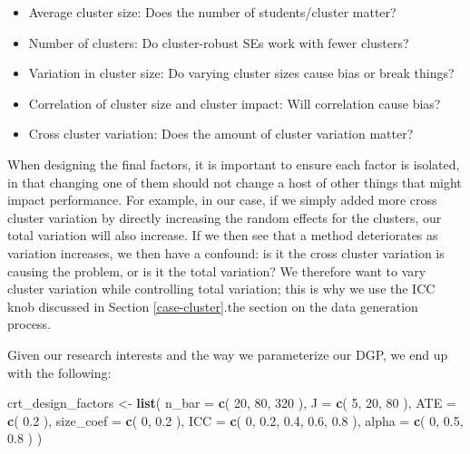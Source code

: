 \documentclass[
]{book}
\newenvironment{Shaded}{\begin{snugshade}}{\end{snugshade}}
\newcommand{\AttributeTok}[1]{\textcolor[rgb]{0.13,0.29,0.53}{#1}}
\newcommand{\DecValTok}[1]{\textcolor[rgb]{0.00,0.00,0.81}{#1}}
\newcommand{\FloatTok}[1]{\textcolor[rgb]{0.00,0.00,0.81}{#1}}
\newcommand{\FunctionTok}[1]{\textcolor[rgb]{0.13,0.29,0.53}{\textbf{#1}}}
\newcommand{\NormalTok}[1]{#1}
\newcommand{\OtherTok}[1]{\textcolor[rgb]{0.56,0.35,0.01}{#1}}
\providecommand{\tightlist}{%
  \setlength{\itemsep}{0pt}\setlength{\parskip}{0pt}}
\begin{document}
\begin{itemize}
\tightlist
\item
  Average cluster size: Does the number of students/cluster matter?
\item
  Number of clusters: Do cluster-robust SEs work with fewer clusters?
\item
  Variation in cluster size: Do varying cluster sizes cause bias or break things?
\item
  Correlation of cluster size and cluster impact: Will correlation cause bias?
\item
  Cross cluster variation: Does the amount of cluster variation matter?
\end{itemize}

When designing the final factors, it is important to ensure each factor is isolated, in that changing one of them should not change a host of other things that might impact performance.
For example, in our case, if we simply added more cross cluster variation by directly increasing the random effects for the clusters, our total variation will also increase.
If we then see that a method deteriorates as variation increases, we then have a confound: is it the cross cluster variation is causing the problem, or is it the total variation?
We therefore want to vary cluster variation while controlling total variation; this is why we use the ICC knob discussed in Section \ref{case-cluster}.the section on the data generation process.

Given our research interests and the way we parameterize our DGP, we end up with the following:

\begin{Shaded}
\begin{Highlighting}[]
\NormalTok{crt\_design\_factors }\OtherTok{\textless{}{-}} \FunctionTok{list}\NormalTok{(}
  \AttributeTok{n\_bar =} \FunctionTok{c}\NormalTok{( }\DecValTok{20}\NormalTok{, }\DecValTok{80}\NormalTok{, }\DecValTok{320}\NormalTok{ ),}
  \AttributeTok{J =} \FunctionTok{c}\NormalTok{( }\DecValTok{5}\NormalTok{, }\DecValTok{20}\NormalTok{, }\DecValTok{80}\NormalTok{ ),}
  \AttributeTok{ATE =} \FunctionTok{c}\NormalTok{( }\FloatTok{0.2}\NormalTok{ ),}
  \AttributeTok{size\_coef =} \FunctionTok{c}\NormalTok{( }\DecValTok{0}\NormalTok{, }\FloatTok{0.2}\NormalTok{ ),}
  \AttributeTok{ICC =} \FunctionTok{c}\NormalTok{( }\DecValTok{0}\NormalTok{, }\FloatTok{0.2}\NormalTok{, }\FloatTok{0.4}\NormalTok{, }\FloatTok{0.6}\NormalTok{, }\FloatTok{0.8}\NormalTok{ ),}
  \AttributeTok{alpha =} \FunctionTok{c}\NormalTok{( }\DecValTok{0}\NormalTok{, }\FloatTok{0.5}\NormalTok{, }\FloatTok{0.8}\NormalTok{ )}
\NormalTok{)}
\end{Highlighting}
\end{Shaded}
\end{document}
